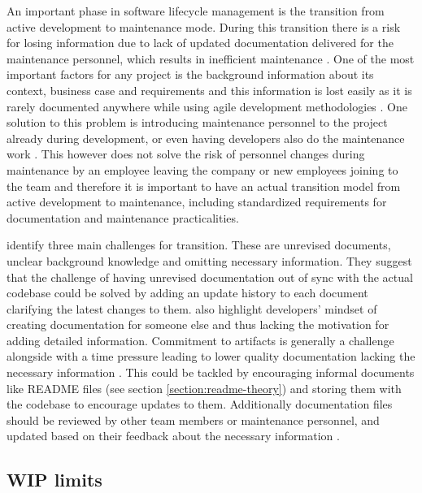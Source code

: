 An important phase in software lifecycle management is the transition from active development to maintenance mode. During this transition there is a risk for losing information
due to lack of updated documentation delivered for the maintenance personnel, which results in inefficient maintenance \citep{Stettina2013}. One of the most important factors for
any project is the background information about its context, business case and requirements and this information is lost easily as it is rarely documented anywhere while using
agile development methodologies \citep{Ito2016}. One solution to this problem is introducing maintenance personnel to the project already during development, or even having
developers also do the maintenance work \citep{Stettina2013}. This however does not solve the risk of personnel changes during maintenance by an employee leaving the company or
new employees joining to the team \citep{Ito2016} and therefore it is important to have an actual transition model from active development to maintenance, including standardized
requirements for documentation and maintenance practicalities.

\citet{Ito2016} identify three main challenges for transition. These are unrevised documents, unclear background knowledge and omitting necessary information. They suggest that
the challenge of having unrevised documentation out of sync with the actual codebase could be solved by adding an update history to each document clarifying the latest changes to them.
\citet{Stettina2013} also highlight developers' mindset of creating documentation for someone else and thus lacking the motivation for adding detailed information. Commitment to
artifacts is generally a challenge alongside with a time pressure leading to lower quality documentation lacking the necessary information \citep{Stettina2013}. This could be tackled
by encouraging informal documents like README files (see section \ref{section:readme-theory}) and storing them with the codebase to encourage updates to them. Additionally documentation
files should be reviewed by other team members or maintenance personnel, and updated based on their feedback about the necessary information \citep{Ito2016}.

\subsection{WIP limits}
\label{section:wip-theory}

